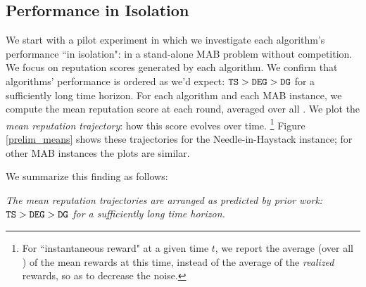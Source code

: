 \documentclass[../competing_bandits.tex]{subfiles}
\begin{document}
\subsection{Performance in Isolation}\label{sec:isolation}

We start with a pilot experiment in which we investigate each algorithm's performance ``in isolation": in a stand-alone MAB problem without competition. We focus on reputation scores generated by each algorithm. We confirm that algorithms' performance is ordered as we'd expect:
    $\mathtt{TS} > \mathtt{DEG} > \mathtt{DG}$
for a sufficiently long time horizon. For each algorithm and each MAB instance, we compute the mean reputation score at each round, averaged over all \MRVs. We plot the \emph{mean reputation trajectory}: how this score evolves over time. %
\footnote{For ``instantaneous reward" at a given time $t$, we report the average (over all \MRVs) of the mean rewards at this time, instead of the average of the \emph{realized} rewards, so as to decrease the noise.}
Figure \ref{prelim_means} shows these trajectories for the Needle-in-Haystack instance; for other MAB instances the plots are similar. 

We summarize this finding as follows:

\begin{finding}
\textit{The mean reputation trajectories  are arranged as predicted by prior work:
    $\mathtt{TS} > \mathtt{DEG} > \mathtt{DG}$ for a sufficiently long time horizon.}
\end{finding}
\end{document}
